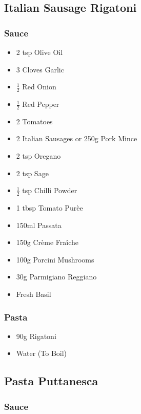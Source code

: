 \documentclass[11pt, english]{article}
\begin{document}
\newpage

	\subsection{Italian Sausage Rigatoni}

		\subsubsection*{Sauce}

	\begin{itemize}
	\setlength\itemsep{0cm}
		\item 2 tsp Olive Oil
		\item 3 Cloves Garlic
		\item $\frac{1}{2}$ Red Onion
		\item $\frac{1}{2}$ Red Pepper
		\item 2 Tomatoes
		\item 2 Italian Sausages or 250g Pork Mince
		\item 2 tsp Oregano
		\item 2 tsp Sage
		\item $\frac{1}{2}$ tsp Chilli Powder
		\item 1 tbsp Tomato Pur\`{e}e
		\item 150ml Passata
		\item 150g Cr\`{e}me Fra\^{i}che
		\item 100g Porcini Mushrooms
		\item 30g Parmigiano Reggiano
		\item Fresh Basil
	\end{itemize}

		\subsubsection*{Pasta}

        \begin{itemize}
        \setlength\itemsep{0cm}
                \item 90g Rigatoni
                \item Water (To Boil)
        \end{itemize}

\newpage

	\subsection{Pasta Puttanesca}

		\subsubsection*{Sauce}
		
\end{document}
